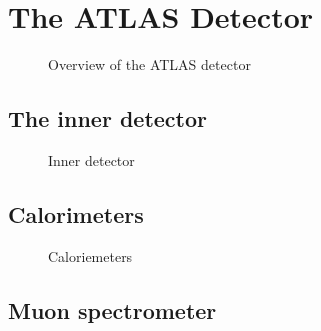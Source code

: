 \section{The ATLAS Detector}

\begin{figure}[htbp]
  \centering

  \caption{Overview of the ATLAS detector}
  \label{fig:atlas_detector_overview}
\end{figure}

\subsection{The inner detector}

\begin{figure}[htbp]
  \centering

  \caption{Inner detector}
  \label{fig:atlas_inner_detector}
\end{figure}


\subsection{Calorimeters}

\begin{figure}[htbp]
  \centering

  \caption{Caloriemeters}
  \label{fig:atlas_calorimeters}
\end{figure}


\subsection{Muon spectrometer}


